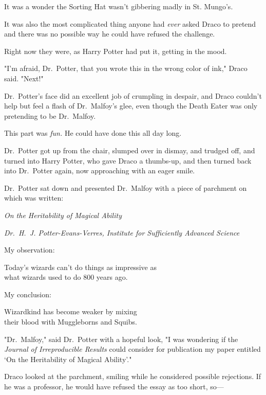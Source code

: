 It was a wonder the Sorting Hat wasn't gibbering madly in St. Mungo's.

It was also the most complicated thing anyone had \emph{ever} asked Draco to
pretend and there was no possible way he could have refused the challenge.

Right now they were, as Harry Potter had put it, getting in the mood.

"I'm afraid, Dr.~Potter, that you wrote this in the wrong color of ink," Draco
said. "Next!"

Dr.~Potter's face did an excellent job of crumpling in despair, and Draco
couldn't help but feel a flash of Dr.~Malfoy's glee, even though the Death
Eater was only pretending to be Dr.~Malfoy.

This part was \emph{fun.} He could have done this all day long.

Dr.~Potter got up from the chair, slumped over in dismay, and trudged off, and
turned into Harry Potter, who gave Draco a thumbs-up, and then turned back into
Dr.~Potter again, now approaching with an eager smile.

Dr.~Potter sat down and presented Dr.~Malfoy with a piece of parchment on which
was written:

\begin{center}
\emph{On the Heritability of Magical Ability}

\emph{Dr.~H.~J. Potter-Evans-Verres, Institute for Sufficiently Advanced
Science}
\end{center}

\begin{writtenNote}
My observation:

Today's wizards can't do things as impressive as\\
what wizards used to do 800 years ago.

My conclusion:

Wizardkind has become weaker by mixing\\
their blood with Muggleborns and Squibs.
\end{writtenNote}

"Dr.~Malfoy," said Dr.~Potter with a hopeful look, "I was wondering if the
\emph{Journal of Irreproducible Results} could consider for publication my
paper entitled `On the Heritability of Magical Ability'."

Draco looked at the parchment, smiling while he considered possible rejections.
If he was a professor, he would have refused the essay as too short, so---

